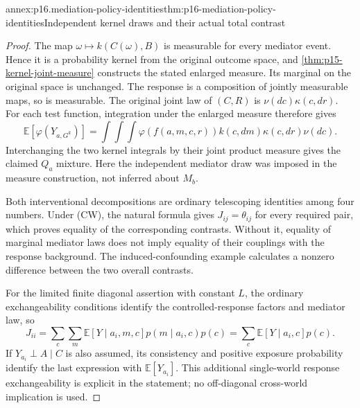 \begin{annexitem}{annex:p16.mediation-policy-identities}{thm:p16-mediation-policy-identities}{Independent kernel draws and their actual total contrast}
\begin{proof}
The map \(\omega\mapsto k(C(\omega),B)\) is measurable for every
mediator event. Hence it is a probability kernel from the original
outcome space, and \cref{thm:p15-kernel-joint-measure} constructs the
stated enlarged measure. Its marginal on the original space is unchanged.
The response is a composition of jointly measurable maps, so is measurable.
The original joint law of \((C,R)\) is \(\nu(dc)\kappa(c,dr)\).
For each test function, integration under the enlarged measure therefore
gives
\[
 \mathbb E[\varphi(Y_{a,G^k})]
 =\int\!\int\!\int\varphi(f(a,m,c,r))k(c,dm)\kappa(c,dr)\nu(dc).
\]
Interchanging the two kernel integrals by their joint product measure
gives the claimed \(Q_a\) mixture. Here the independent mediator draw
was imposed in the measure construction, not inferred about \(M_b\).

Both interventional decompositions are ordinary telescoping identities
among four numbers. Under (CW), the natural formula gives \(J_{ij}
=\theta_{ij}\) for every required pair, which proves equality of the
corresponding contrasts. Without it, equality of marginal mediator laws
does not imply equality of their couplings with the response background.
The induced-confounding example calculates a nonzero difference between
the two overall contrasts.

For the limited finite diagonal assertion with constant \(L\), the
ordinary exchangeability conditions identify the controlled-response
factors and mediator law, so
\[
 J_{ii}=\sum_c\sum_m\mathbb E[Y\mid a_i,m,c]p(m\mid a_i,c)p(c)
       =\sum_c\mathbb E[Y\mid a_i,c]p(c).
\]
If \(Y_{a_i}\perp A\mid C\) is also assumed, its consistency and
positive exposure probability identify the last expression with
\(\mathbb E[Y_{a_i}]\). This additional single-world response
exchangeability is explicit in the statement; no off-diagonal
cross-world implication is used.
\end{proof}
\end{annexitem}

